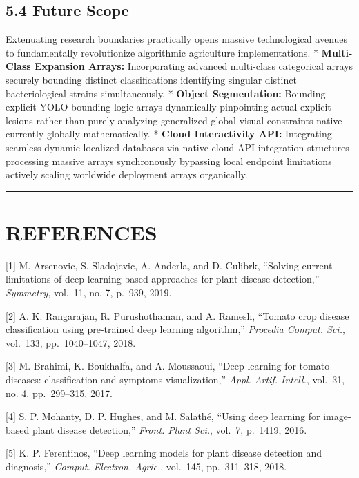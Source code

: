 \documentclass[
]{article}
\begin{document}
\subsection{5.4 Future Scope}\label{future-scope}

Extenuating research boundaries practically opens massive technological
avenues to fundamentally revolutionize algorithmic agriculture
implementations. * \textbf{Multi-Class Expansion Arrays:} Incorporating
advanced multi-class categorical arrays securely bounding distinct
classifications identifying singular distinct bacteriological strains
simultaneously. * \textbf{Object Segmentation:} Bounding explicit YOLO
bounding logic arrays dynamically pinpointing actual explicit lesions
rather than purely analyzing generalized global visual constraints
native currently globally mathematically. * \textbf{Cloud Interactivity
API:} Integrating seamless dynamic localized databases via native cloud
API integration structures processing massive arrays synchronously
bypassing local endpoint limitations actively scaling worldwide
deployment arrays organically.

\begin{center}\rule{0.5\linewidth}{0.5pt}\end{center}

\section{REFERENCES}\label{references}

{[}1{]} M. Arsenovic, S. Sladojevic, A. Anderla, and D. Culibrk,
``Solving current limitations of deep learning based approaches for
plant disease detection,'' \emph{Symmetry}, vol.~11, no. 7, p.~939,
2019.

{[}2{]} A. K. Rangarajan, R. Purushothaman, and A. Ramesh, ``Tomato crop
disease classification using pre-trained deep learning algorithm,''
\emph{Procedia Comput. Sci.}, vol.~133, pp.~1040--1047, 2018.

{[}3{]} M. Brahimi, K. Boukhalfa, and A. Moussaoui, ``Deep learning for
tomato diseases: classification and symptoms visualization,''
\emph{Appl. Artif. Intell.}, vol.~31, no. 4, pp.~299--315, 2017.

{[}4{]} S. P. Mohanty, D. P. Hughes, and M. Salathé, ``Using deep
learning for image-based plant disease detection,'' \emph{Front. Plant
Sci.}, vol.~7, p.~1419, 2016.

{[}5{]} K. P. Ferentinos, ``Deep learning models for plant disease
detection and diagnosis,'' \emph{Comput. Electron. Agric.}, vol.~145,
pp.~311--318, 2018.
\end{document}
